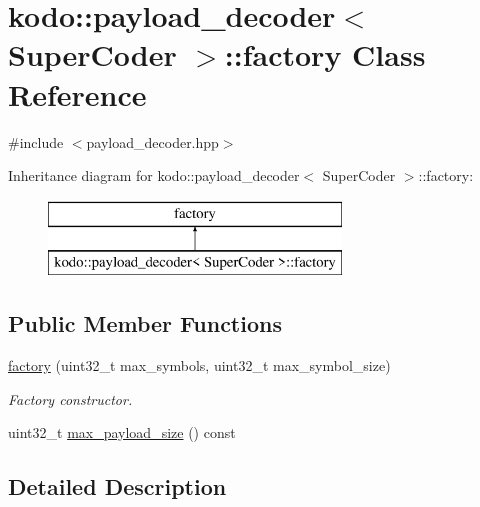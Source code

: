 \hypertarget{classkodo_1_1payload__decoder_1_1factory}{\section{kodo\-:\-:payload\-\_\-decoder$<$ Super\-Coder $>$\-:\-:factory Class Reference}
\label{classkodo_1_1payload__decoder_1_1factory}
}


{\ttfamily \#include $<$payload\-\_\-decoder.\-hpp$>$}

Inheritance diagram for kodo\-:\-:payload\-\_\-decoder$<$ Super\-Coder $>$\-:\-:factory\-:\begin{figure}[H]
\begin{center}
\leavevmode
\includegraphics[height=2.000000cm]{classkodo_1_1payload__decoder_1_1factory}
\end{center}
\end{figure}
\subsection*{Public Member Functions}
\begin{DoxyCompactItemize}
\item 
\hyperlink{classkodo_1_1payload__decoder_1_1factory_a971299568a838d39bb98ea3519ae422e}{factory} (uint32\-\_\-t max\-\_\-symbols, uint32\-\_\-t max\-\_\-symbol\-\_\-size)
\begin{DoxyCompactList}\small\item\em Factory constructor. \end{DoxyCompactList}\item 
uint32\-\_\-t \hyperlink{classkodo_1_1payload__decoder_1_1factory_af3287545b50932cfdbd87243c22b1e72}{max\-\_\-payload\-\_\-size} () const 
\begin{DoxyCompactList}\small\item\em \end{DoxyCompactList}\end{DoxyCompactItemize}


\subsection{Detailed Description}
